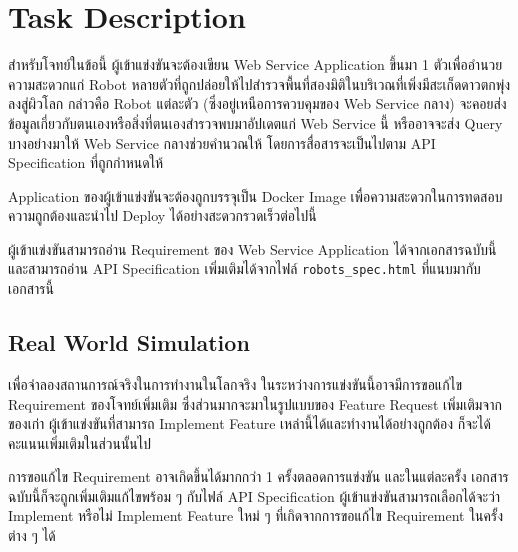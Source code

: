 

\section{Task Description}

สำหรับโจทย์ในข้อนี้ ผู้เข้าแข่งขันจะต้องเขียน Web Service Application ขึ้นมา 1 ตัวเพื่ออำนวยความสะดวกแก่ Robot หลายตัวที่ถูกปล่อยให้ไปสำรวจพื้นที่สองมิติในบริเวณที่เพิ่งมีสะเก็ดดาวตกพุ่งลงสู่ผิวโลก \;
กล่าวคือ Robot แต่ละตัว (ซึ่งอยู่เหนือการควบคุมของ Web Service กลาง) จะคอยส่งข้อมูลเกี่ยวกับตนเองหรือสิ่งที่ตนเองสำรวจพบมาอัปเดตแก่ Web Service นี้ หรืออาจจะส่ง Query บางอย่างมาให้ Web Service กลางช่วยคำนวณให้ โดยการสื่อสารจะเป็นไปตาม API Specification ที่ถูกกำหนดให้ \;

Application ของผู้เข้าแข่งขันจะต้องถูกบรรจุเป็น Docker Image เพื่อความสะดวกในการทดสอบความถูกต้องและนำไป Deploy ได้อย่างสะดวกรวดเร็วต่อไปนี้

ผู้เข้าแข่งขันสามารถอ่าน Requirement ของ Web Service Application ได้จากเอกสารฉบับนี้ และสามารถอ่าน API Specification เพิ่มเติมได้จากไฟล์ \verb'robots_spec.html' ที่แนบมากับเอกสารนี้


\subsection{Real World Simulation}

เพื่อจำลองสถานการณ์จริงในการทำงานในโลกจริง ในระหว่างการแข่งขันนี้อาจมีการขอแก้ไข Requirement ของโจทย์เพิ่มเติม ซึ่งส่วนมากจะมาในรูปแบบของ Feature Request เพิ่มเติมจากของเก่า \;
ผู้เข้าแข่งขันที่สามารถ Implement Feature เหล่านี้ได้และทำงานได้อย่างถูกต้อง ก็จะได้คะแนนเพิ่มเติมในส่วนนั้นไป

การขอแก้ไข Requirement อาจเกิดขึ้นได้มากกว่า 1 ครั้งตลอดการแข่งขัน และในแต่ละครั้ง เอกสารฉบับนี้ก็จะถูกเพิ่มเติมแก้ไขพร้อม ๆ กับไฟล์ API Specification \;
ผู้เข้าแข่งขันสามารถเลือกได้จะว่า Implement หรือไม่ Implement Feature ใหม่ ๆ ที่เกิดจากการขอแก้ไข Requirement ในครั้งต่าง ๆ ได้

